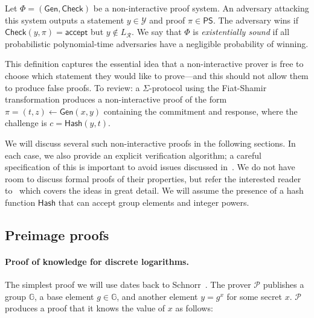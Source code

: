 \documentclass[12pt,a4paper]{article}
\theoremstyle{definition}
\begin{document}
\begin{definition}
    Let $\Phi=(\mathsf{Gen}, \mathsf{Check})$ be a non-interactive proof system. An adversary attacking this system outputs a statement $y\in\mathcal{Y}$ and proof $\pi\in\mathsf{PS}$. The adversary wins if $\mathsf{Check}(y, \pi)=\mathsf{accept}$ but $y\notin L_\mathcal{R}$. We say that $\Phi$ is \textit{existentially sound} if all probabilistic polynomial-time adversaries have a negligible probability of winning.
\end{definition}
This definition captures the essential idea that a non-interactive prover is free to choose which statement they would like to prove---and this should not allow them to produce false proofs. To review: a $\Sigma$-protocol using the Fiat-Shamir transformation produces a non-interactive proof of the form $\pi = (t, z)\gets\mathsf{Gen}(x, y)$ containing the commitment and response, where the challenge is $c = \mathsf{Hash}(y, t)$.

We will discuss several such non-interactive proofs in the following sections. In each case, we also provide an explicit verification algorithm; a careful specification of this is important to avoid issues discussed in~\cite{mcmurtry2020test}. We do not have room to discuss formal proofs of their properties, but refer the interested reader to~\cite{boneh2020graduate} which covers the ideas in great detail. We will assume the presence of a hash function $\mathsf{Hash}$ that can accept group elements and integer powers.

\subsection{Preimage proofs}
\paragraph{Proof of knowledge for discrete logarithms.}
The simplest proof we will use dates back to Schnorr~\cite{schnorr1991efficient}. The prover $\mathcal{P}$ publishes a group $\mathbb{G}$, a base element $g\in\mathbb{G}$, and another element $y = g^x$ for some secret $x$. $\mathcal{P}$ produces a proof that it knows the value of $x$ as follows:
\end{document}
